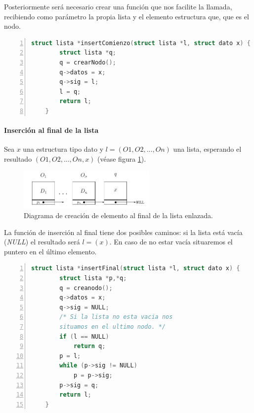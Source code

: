 \documentclass[a4paper, 11pt, titlepage]{article}
\begin{document}
            Posteriormente será necesario crear una función que nos facilite la llamada, recibiendo
            como parámetro la propia lista y el elemento estructura que, que es el nodo.

            \begin{lstlisting}[language=C,numbers=left]
    struct lista *insertComienzo(struct lista *l, struct dato x) {
        struct lista *q;
        q = crearNodo(); 
        q->datos = x; 
        q->sig = l;
        l = q;
        return l;    
    }\end{lstlisting} 
            
            \paragraph{Inserción al final de la lista} Sea $x$ una estructura tipo dato 
            y $l = (O1, O2, ... , On)$ una lista, esperando el resultado $(O1, O2, ... , On, x)$
            (véase figura \ref{listaenlazada06}).

            \begin{figure}[htp]
                \centering
                \includegraphics[width=0.6\textwidth]{resources/listaenlazada06.jpg}
                \caption{Diagrama de creación de elemento al final de la lista enlazada.}
                \label{listaenlazada06}
            \end{figure}

            La función de inserción al final tiene dos posibles caminos: si la lista está vacía 
            (\textit{NULL}) el resultado será $l = (x)$. En caso de no estar vacía situaremos el puntero 
            en el último elemento.

            \begin{lstlisting}[language=C,numbers=left]
    struct lista *insertFinal(struct lista *l, struct dato x) {
        struct lista *p,*q;
        q = creanodo(); 
        q->datos = x;
        q->sig = NULL;
        /* Si la lista no esta vacia nos 
        situamos en el ultimo nodo. */
        if (l == NULL)
            return q;
        p = l;
        while (p->sig != NULL)
            p = p->sig;
        p->sig = q;
        return l;
    }\end{lstlisting}         
\end{document}
